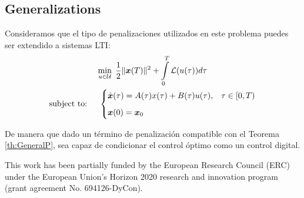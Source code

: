 \documentclass[twocolumn]{autart}    %
\begin{document}
\subsection{Generalizations}


Consideramos que el tipo de penalizaciones utilizados en este problema puedes ser extendido a sistemas LTI:
\begin{gather}
	\min_{u \in \mathcal{U}}\;\frac 12 \|\bm{x}(T)\|^2 + \int_0^T \mathcal{L}(u(\tau))d\tau
	\\
    \notag \text{subject to: }\quad \begin{cases}
            \displaystyle \dot{\bm{x}}(\tau) = A(\tau)x(\tau) +B(\tau)u(\tau),  & \tau \in [0,T)\\[6pt]
            \bm{x}(0) = \bm{x}_0
    \end{cases}
\end{gather}

De manera que dado un término de penalización compatible con el Teorema \ref{th:GeneralP}, sea capaz de condicionar el control óptimo como un control digital.


\begin{ack}                               %
This work has been partially funded by the European Research Council (ERC) under the European Union’s Horizon 2020 research and innovation program
(grant agreement No. 694126-DyCon).
\end{ack}
 


 
\end{document}
